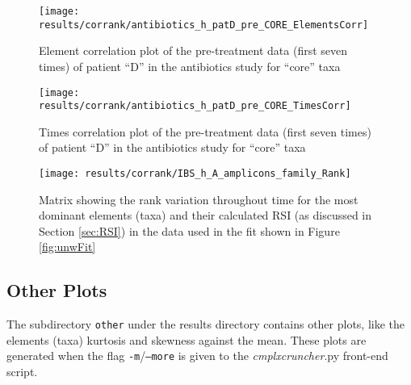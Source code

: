 \documentclass[12pt]{article}
\newcommand{\CC}[0]{\emph{cmplxcruncher}}
\begin{document}
\begin{figure}
	\centering
	\texttt{[image: results/corrank/antibiotics\_h\_patD\_pre\_CORE\_ElementsCorr]}
	\caption{Element correlation plot of the pre-treatment data (first seven times) of patient ``D'' in the antibiotics study\cite{antibiotic} for ``core'' taxa}
	\label{fig:corrElm}
\end{figure}

\begin{figure}
	\centering
	\texttt{[image: results/corrank/antibiotics\_h\_patD\_pre\_CORE\_TimesCorr]}
	\caption{Times correlation plot of the pre-treatment data (first seven times) of patient ``D'' in the antibiotics study\cite{antibiotic} for ``core'' taxa}
	\label{fig:corrTim}
\end{figure}

\begin{figure}
	\centering
	\texttt{[image: results/corrank/IBS\_h\_A\_amplicons\_family\_Rank]}
	\caption{Matrix showing the rank variation throughout time for the most dominant elements (taxa) and their calculated RSI (as discussed in Section \ref{sec:RSI}) in the data used in the fit shown in Figure \ref{fig:unwFit}}
	\label{fig:corrank}
\end{figure}

\subsection{Other Plots} 
The subdirectory \texttt{other} under the results directory contains other plots, like the elements (taxa) kurtosis and skewness against the mean. These plots are generated when the flag \texttt{-m}/\texttt{--more} is given to the \CC.py front-end script.
\end{document}
